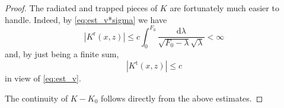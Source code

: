 \documentclass[10pt,a4paper]{amsart}
\newcommand{\dd}{\mathrm d}
\begin{document}
\begin{proof}
	The radiated and trapped pieces of $K$ are fortunately much easier to handle. Indeed, by \eqref{eq:est_v*sigma} we have
	\[|K^{\mathrm{r}}(x,z)|\le c\int_0^{F_0} \frac{\dd\lambda}{\sqrt{F_0-\lambda} \sqrt\lambda} <\infty\]
	and, by just being a finite sum,
	\[|K^{\mathrm{t}}(x,z)|\le c\]
	in view of \eqref{eq:est_v}.
	
	The continuity of $K-K_0$ follows directly from the above estimates.
\end{proof}
\end{document}
